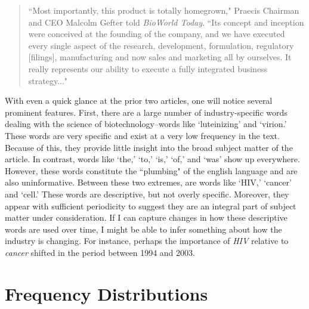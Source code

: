 \begin{singlespace}
\begin{small}
\begin{quotation}
``Most importantly, this product is totally homegrown," Praecis Chairman and CEO Malcolm Gefter told \emph{BioWorld Today}. ``Its concept and inception were conceived at the founding of the company, and we have executed every single aspect of the research, development, formulation, regulatory [filings], manufacturing and now sales and marketing all by ourselves. It really represents our ability to execute a fully integrated business strategy..."

\end{quotation}
\end{small}
\end{singlespace}

With even a quick glance at the prior two articles, one will notice several prominent features. First, there are a large number of industry-specific words dealing with the science of biotechnology--words like `luteinizing' and `virion.' These words are very specific and exist at a very low frequency in the text. Because of this, they provide little insight into the broad subject matter of the article. In contrast, words like `the,' `to,' `is,' `of,' and `was' show up everywhere. However, these words constitute the ``plumbing" of the english language and are also uninformative. Between these two extremes, are words like `HIV,' `cancer' and `cell.' These words are descriptive, but not overly specific. Moreover, they appear with sufficient periodicity to suggest they are an integral part of subject matter under consideration. If I can capture changes in how these descriptive words are used over time, I might be able to infer something about how the industry is changing. For instance, perhaps the importance of \emph{HIV} relative to \emph{cancer} shifted in the period between 1994 and 2003.

\section{Frequency Distributions}

